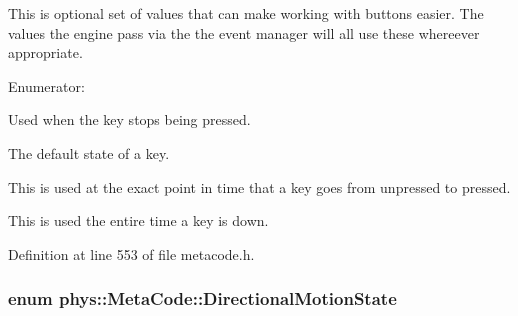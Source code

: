 This is optional set of values that can make working with buttons easier. The values the engine pass via the the event manager will all use these whereever appropriate. \begin{Desc}
\item[Enumerator: ]\par
\begin{description}
\item[{\em 
\hypertarget{classphys_1_1MetaCode_a2fdfb26b3e50ceb0ccc60bfc4c3d6ac2a6b5564408703517f36debd8c423e2dee}{
BUTTON\_\-LIFTING}
\label{da/dc9/classphys_1_1MetaCode_a2fdfb26b3e50ceb0ccc60bfc4c3d6ac2a6b5564408703517f36debd8c423e2dee}
}]Used when the key stops being pressed. \item[{\em 
\hypertarget{classphys_1_1MetaCode_a2fdfb26b3e50ceb0ccc60bfc4c3d6ac2ae275c52779b0f6ec37533af256a70cc3}{
BUTTON\_\-UP}
\label{da/dc9/classphys_1_1MetaCode_a2fdfb26b3e50ceb0ccc60bfc4c3d6ac2ae275c52779b0f6ec37533af256a70cc3}
}]The default state of a key. \item[{\em 
\hypertarget{classphys_1_1MetaCode_a2fdfb26b3e50ceb0ccc60bfc4c3d6ac2a33669b2b9ca814664296da55702e412d}{
BUTTON\_\-PRESSING}
\label{da/dc9/classphys_1_1MetaCode_a2fdfb26b3e50ceb0ccc60bfc4c3d6ac2a33669b2b9ca814664296da55702e412d}
}]This is used at the exact point in time that a key goes from unpressed to pressed. \item[{\em 
\hypertarget{classphys_1_1MetaCode_a2fdfb26b3e50ceb0ccc60bfc4c3d6ac2a5b52ee1db94dbc2db23f3b4c267b5438}{
BUTTON\_\-DOWN}
\label{da/dc9/classphys_1_1MetaCode_a2fdfb26b3e50ceb0ccc60bfc4c3d6ac2a5b52ee1db94dbc2db23f3b4c267b5438}
}]This is used the entire time a key is down. \end{description}
\end{Desc}



Definition at line 553 of file metacode.h.

\hypertarget{classphys_1_1MetaCode_ad6ed6266b5f4219a6f5da29ebe018757}{
\subsubsection[{DirectionalMotionState}]{\setlength{\rightskip}{0pt plus 5cm}enum {\bf phys::MetaCode::DirectionalMotionState}}}
\label{da/dc9/classphys_1_1MetaCode_ad6ed6266b5f4219a6f5da29ebe018757}


